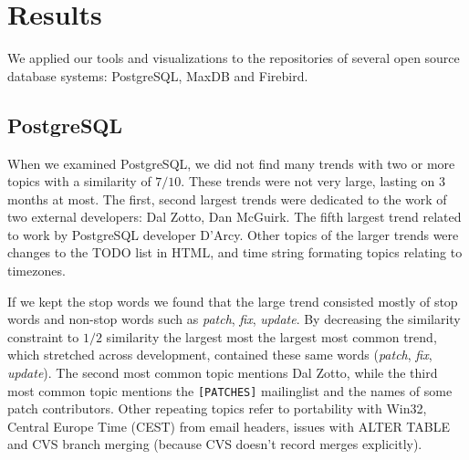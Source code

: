 \documentclass[times, 10pt,twocolumn]{article}
\newcommand{\shrinkit}{\vspace*{-.3em}}
\begin{document}









\shrinkit
\section{Results}
\shrinkit

We applied our tools and visualizations to the repositories of several
open source database systems: PostgreSQL, MaxDB and Firebird.



\shrinkit
\subsection{PostgreSQL}
\shrinkit


When we examined PostgreSQL, we did not find many trends with two or
more topics with a similarity of $7/10$. These trends were not very
large, lasting on 3 months at most. The first, second largest trends
were dedicated to the work of two external developers: Dal Zotto, Dan
McGuirk. The fifth largest trend related to work by PostgreSQL developer D'Arcy. Other
topics of the larger trends were changes to the TODO list in HTML, and
time string formating topics relating to timezones.

If we kept the stop words we found that the large trend consisted
mostly of stop words and non-stop words such as \emph{patch},
\emph{fix}, \emph{update}.  By decreasing the similarity constraint to
$1/2$ similarity the largest most the largest most common trend, which
stretched across development, contained these same words
(\emph{patch}, \emph{fix}, \emph{update}). The second most common
topic mentions Dal Zotto, while the third most common topic mentions
the \texttt{[PATCHES]} mailinglist and the names of some patch
contributors.  Other repeating topics refer to portability with Win32,
Central Europe Time (CEST) from email headers, issues with ALTER TABLE
and CVS branch merging (because CVS doesn't record merges explicitly).
\end{document}
